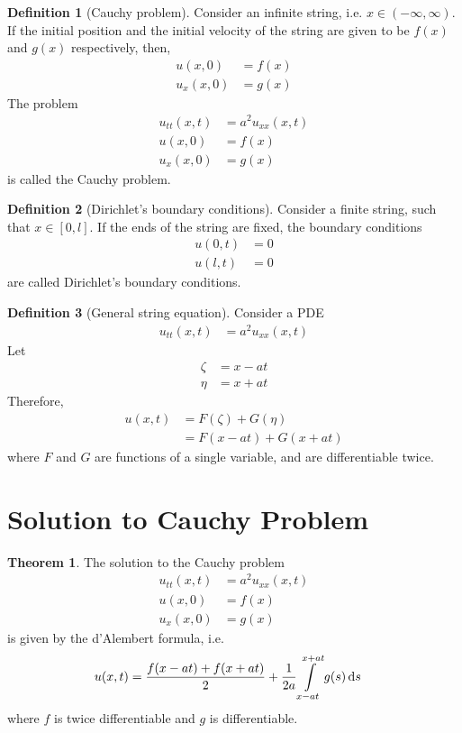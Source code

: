 \documentclass[titlepage, fleqn, a4paper, 12pt, twoside]{article}
\theoremstyle{definition}
\newtheorem{definition}{Definition}
\theoremstyle{theorem}
\newtheorem{theorem}{Theorem}
\begin{document}
\begin{definition}[Cauchy problem]
	Consider an infinite string, i.e. $x \in (-\infty,\infty)$.
	If the initial position and the initial velocity of the string are given to be $f(x)$ and $g(x)$ respectively, then,
	\begin{align*}
		u(x,0)   & = f(x) \\
		u_x(x,0) & = g(x)
	\end{align*}
	The problem
	\begin{align*}
		u_{t t}(x,t) & = a^2 u_{x x}(x,t) \\
		u(x,0)       & = f(x)             \\
		u_x(x,0)     & = g(x)
	\end{align*}
	is called the Cauchy problem.
\end{definition}

\begin{definition}[Dirichlet's boundary conditions]
	Consider a finite string, such that $x \in [0,l]$.
	If the ends of the string are fixed, the boundary conditions
	\begin{align*}
		u(0,t) & = 0 \\
		u(l,t) & = 0
	\end{align*}
	are called Dirichlet's boundary conditions.
\end{definition}

\begin{definition}[General string equation]
	Consider a PDE
	\begin{align*}
		u_{t t}(x,t) & = a^2 u_{x x}(x,t)
	\end{align*}
	Let
	\begin{align*}
		\zeta & = x - a t \\
		\eta  & = x + a t
	\end{align*}
	Therefore,
	\begin{align*}
		u(x,t) & = F(\zeta) + G(\eta) \\
                       & = F(x - a t) + G(x + a t)
	\end{align*}
	where $F$ and $G$ are functions of a single variable, and are differentiable twice.
\end{definition}

\section{Solution to Cauchy Problem}

\begin{theorem}
	The solution to the Cauchy problem
	\begin{align*}
		u_{t t}(x,t) & = a^2 u_{x x}(x,t) \\
		u(x,0)       & = f(x)             \\
		u_x(x,0)     & = g(x)
	\end{align*}
	is given by the d'Alembert formula, i.e.
	\begin{align*}
		u(x,t) & = \frac{f(x - a t) + f(x + a t)}{2} + \frac{1}{2 a} \int\limits_{x - a t}^{x + a t} g(s) \dif s
	\end{align*}
	where $f$ is twice differentiable and $g$ is differentiable.
\end{theorem}
\end{document}
